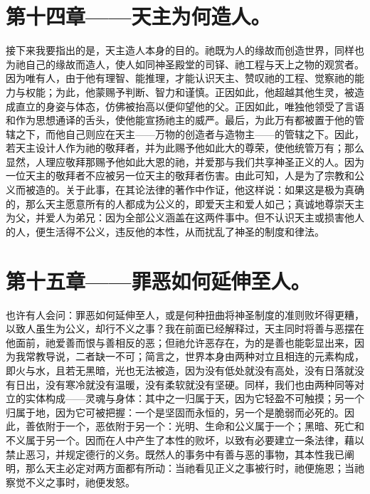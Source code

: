 
\section{第十四章——天主为何造人。}

接下来我要指出的是，天主造人本身的目的。祂既为人的缘故而创造世界，同样也为祂自己的缘故而造人，使人如同神圣殿堂的司铎、祂工程与天上之物的观赏者。因为唯有人，由于他有理智、能推理，才能认识天主、赞叹祂的工程、觉察祂的能力与权能；为此，他蒙赐予判断、智力和谨慎。正因如此，他超越其他生灵，被造成直立的身姿与体态，仿佛被抬高以便仰望他的父。正因如此，唯独他领受了言语和作为思想通译的舌头，使他能宣扬祂主的威严。最后，为此万有都被置于他的管辖之下，而他自己则应在天主——万物的创造者与造物主——的管辖之下。因此，若天主设计人作为祂的敬拜者，并为此赐予他如此大的尊荣，使他统管万有；那么显然，人理应敬拜那赐予他如此大恩的祂，并爱那与我们共享神圣正义的人。因为一位天主的敬拜者不应被另一位天主的敬拜者伤害。由此可知，人是为了宗教和公义而被造的。关于此事，在其论法律的著作中作证，他这样说：如果这是极为真确的，那么天主愿意所有的人都成为公义的，即爱天主和爱人如己；真诚地尊崇天主为父，并爱人为弟兄：因为全部公义涵盖在这两件事中。但不认识天主或损害他人的人，便生活得不公义，违反他的本性，从而扰乱了神圣的制度和律法。\par


\section{第十五章——罪恶如何延伸至人。}

也许有人会问：罪恶如何延伸至人，或是何种扭曲将神圣制度的准则败坏得更糟，以致人虽生为公义，却行不义之事？我在前面已经解释过，天主同时将善与恶摆在他面前，祂爱善而恨与善相反的恶；但祂允许恶存在，为的是善也能彰显出来，因为我常教导说，二者缺一不可；简言之，世界本身由两种对立且相连的元素构成，即火与水，且若无黑暗，光也无法被造，因为没有低处就没有高处，没有日落就没有日出，没有寒冷就没有温暖，没有柔软就没有坚硬。同样，我们也由两种同等对立的实体构成——灵魂与身体：其中之一归属于天，因为它轻盈不可触摸；另一个归属于地，因为它可被把握：一个是坚固而永恒的，另一个是脆弱而必死的。因此，善依附于一个，恶依附于另一个：光明、生命和公义属于一个；黑暗、死亡和不义属于另一个。因而在人中产生了本性的败坏，以致有必要建立一条法律，藉以禁止恶习，并规定德行的义务。既然人的事务中有善与恶的事物，其本性我已阐明，那么天主必定对两方面都有所动：当祂看见正义之事被行时，祂便施恩；当祂察觉不义之事时，祂便发怒。\par

